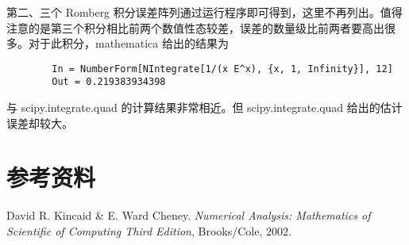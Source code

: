 \documentclass{ctexart}
\begin{document}
	第二、三个 Romberg 积分误差阵列通过运行程序即可得到，这里不再列出。值得注意的是第三个积分相比前两个数值性态较差，误差的数量级比前两者要高出很多。对于此积分，mathematica 给出的结果为
	\begin{verbatim}
		In = NumberForm[NIntegrate[1/(x E^x), {x, 1, Infinity}], 12]
		Out = 0.219383934398
	\end{verbatim}
	
	与 scipy.integrate.quad 的计算结果非常相近。但 scipy.integrate.quad 给出的估计误差却较大。	

\section*{参考资料}
	\noindent [1] David R. Kincaid \& E. Ward Cheney. {\it Numerical Analysis: Mathematics of Scientific of Computing Third Edition}, Brooks/Cole, 2002.
\end{document}
